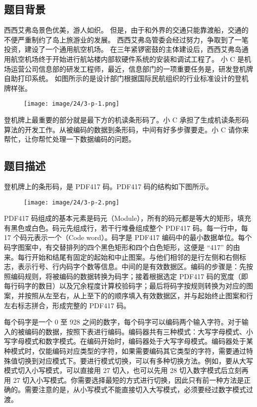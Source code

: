 \subsection*{题目背景}

西西艾弗岛景色优美，游人如织。
但是，由于和外界的交通只能靠渡船，交通的不便严重制约了岛上旅游业的发展。
西西艾弗岛管委会经过努力，争取到了一笔投资，建设了一个通用航空机场。
在三年紧锣密鼓的主体建设后，西西艾弗岛通用航空机场终于开始进行航站楼内部软硬件系统的安装和调试工程了。
小 C 是机场运营公司信息部的研发工程师，最近，信息部门的一项重要任务是，研发登机牌自助打印系统。
如图所示的是设计部门根据国际民航组织的行业标准设计的登机牌样张。

\begin{figure}[H]
    \centering
    \texttt{[image: image/24/3-p-1.png]}
\end{figure}

登机牌上最重要的部分就是最下方的机读条形码了。小 C 承担了生成机读条形码算法的开发工作。从被编码的数据到条形码，中间有好多步骤要走。小 C 请你来帮忙，让你帮忙处理一下数据编码的问题。

\subsection*{题目描述}

登机牌上的条形码，是 PDF417 码。PDF417 码的结构如下图所示。

\begin{figure}[H]
    \centering
    \texttt{[image: image/24/3-p-2.png]}
\end{figure}

PDF417 码组成的基本元素是码元（Module），所有的码元都是等大的矩形，填充有黑色或白色。码元先组成行，若干行堆叠组成整个 PDF417 码。每一行中，每 17 个码元表示一个{}（Code word）。码字是 PDF417 编码中的最小数据单位。每个码字图案中，有交替排列的四个黑色矩形和四个白色矩形，这便是 “417” 的由来。每行开始和结尾有固定的起始和中止图案。与他们相邻的是行左侧和右侧标志，表示行号、行内码字个数等信息。中间的是有效数据区。编码的步骤是：先按照编码规则，将被编码的数据转换为码字；接着根据选定 PDF417 码的宽度（即每行码字的数目）以及冗余程度计算校验码字；最后将码字按规则转换为对应的图案，并按照从左至右，从上至下的的顺序填入有效数据区，并与起始终止图案和行左右标志拼合，形成完整的 PDF417 码。

每个码字是一个 0 至 928 之间的数字，每个码字可以编码两个输入字符。对于输入的被编码的数据，按照下表进行编码。编码器共有三种模式：大写字母模式、小写字母模式和数字模式。在编码开始时，编码器处于大写字母模式。编码器处于某种模式时，仅能编码对应类型的字符，如果需要编码其它类型的字符，需要通过特殊值切换到对应模式下。要进行模式切换，可以有多种切换方法。例如，要从大写模式切入小写模式，可以直接用 27 切入，也可以先用 28 切入数字模式后立刻再用 27 切入小写模式。你需要选择最短的方式进行切换，因此只有前一种方法是正确的。需要注意的是，从小写模式不能直接切入大写模式，必须要经过数字模式过渡。


